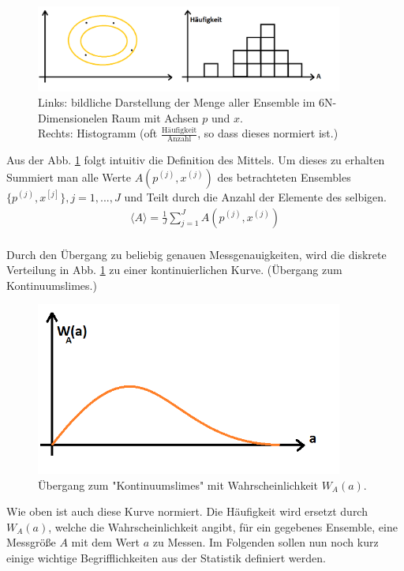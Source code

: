 	\begin{figure}[H]
		\includegraphics[width=0.9\textwidth]{Abb/abb21.png}
		\caption{Links: bildliche Darstellung der Menge aller Ensemble im 6N-Dimensionelen Raum mit Achsen $p$ und $x$.\\ Rechts: Histogramm (oft $\frac{\text{Häufigkeit}}{\text{Anzahl}}$, so dass dieses normiert ist.)}
		\label{HTT}
	\end{figure}
		
	Aus der Abb. \ref{HTT} folgt intuitiv die Definition des Mittels. Um dieses zu erhalten Summiert man alle Werte $A(p^{(j)},x^{(j)})$ des betrachteten Ensembles $\{p^{(j)},x^{[j]}\}, j=1,...,J $ und Teilt durch die Anzahl der Elemente des selbigen.
	\begin{align*}
		\langle A \rangle = \frac{1}{J} \sum_{j=1}^{J} A(p^{(j)},x^{(j)}) \\
	\end{align*}
	
	\noindent Durch den Übergang zu beliebig genauen Messgenauigkeiten, wird die diskrete Verteilung in Abb. \ref{HTT} zu einer kontinuierlichen Kurve. (Übergang zum Kontinuumslimes.)
	
	\begin{figure}[H]
		\includegraphics[width=0.9\textwidth]{Abb/abb22.png}
		\caption{Übergang zum "Kontinuumslimes" mit Wahrscheinlichkeit $W_A(a)$.}
	\end{figure}
	\noindent Wie oben ist auch diese Kurve normiert. Die Häufigkeit wird ersetzt durch $W_A(a)$, welche die Wahrscheinlichkeit angibt, für ein gegebenes Ensemble, eine Messgröße $A$ mit dem Wert $a$ zu Messen. 	
	\newline \newline
	Im Folgenden sollen nun noch kurz einige wichtige Begrifflichkeiten aus der Statistik definiert werden.
	

